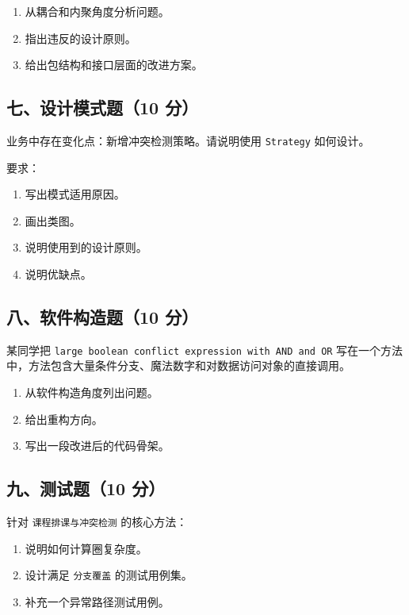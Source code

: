 \documentclass[UTF8,zihao=-4]{ctexart}
\begin{document}
\begin{enumerate}
\item 从耦合和内聚角度分析问题。
\item 指出违反的设计原则。
\item 给出包结构和接口层面的改进方案。
\end{enumerate}


\subsection{七、设计模式题（10 分）}


业务中存在变化点：新增冲突检测策略。请说明使用 \texttt{Strategy} 如何设计。


要求：


\begin{enumerate}
\item 写出模式适用原因。
\item 画出类图。
\item 说明使用到的设计原则。
\item 说明优缺点。
\end{enumerate}


\subsection{八、软件构造题（10 分）}


某同学把 \texttt{large boolean conflict expression with AND and OR} 写在一个方法中，方法包含大量条件分支、魔法数字和对数据访问对象的直接调用。


\begin{enumerate}
\item 从软件构造角度列出问题。
\item 给出重构方向。
\item 写出一段改进后的代码骨架。
\end{enumerate}


\subsection{九、测试题（10 分）}


针对 \texttt{课程排课与冲突检测} 的核心方法：


\begin{enumerate}
\item 说明如何计算圈复杂度。
\item 设计满足 \texttt{分支覆盖} 的测试用例集。
\item 补充一个异常路径测试用例。
\end{enumerate}
\end{document}
